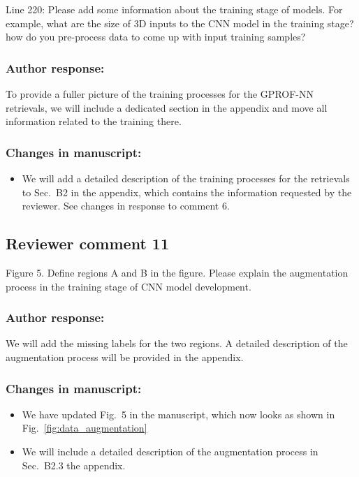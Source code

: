 Line 220: Please add some information about the training stage of models. For
example, what are the size of 3D inputs to the CNN model in the training stage?
how do you pre-process data to come up with input training samples?

\subsubsection*{Author response:}

To provide a fuller picture of the training processes for the GPROF-NN retrievals,
we will include a dedicated section in the appendix and move all information related
to the training there.

\subsubsection*{Changes in manuscript:}

\begin{itemize}
  \item We will add a detailed description of the training processes for the 
    retrievals to Sec.~B2 in the appendix, which contains the information requested by
    the reviewer. See changes in response to comment 6.
 \end{itemize}


\subsection*{Reviewer comment 11}

Figure 5. Define regions A and B in the figure. Please explain the augmentation
process in the training stage of CNN model development.

\subsubsection*{Author response:}

We will add the missing labels for the two regions. A detailed description
of the augmentation process will be provided in the appendix.

\subsubsection*{Changes in manuscript:}

\begin{itemize}
  \item We have updated Fig.~5 in the manuscript, which now looks as shown
    in Fig.~\ref{fig:data_augmentation}
  \item We will include a detailed description of the augmentation process
    in Sec.~B2.3 the appendix.
\end{itemize}

